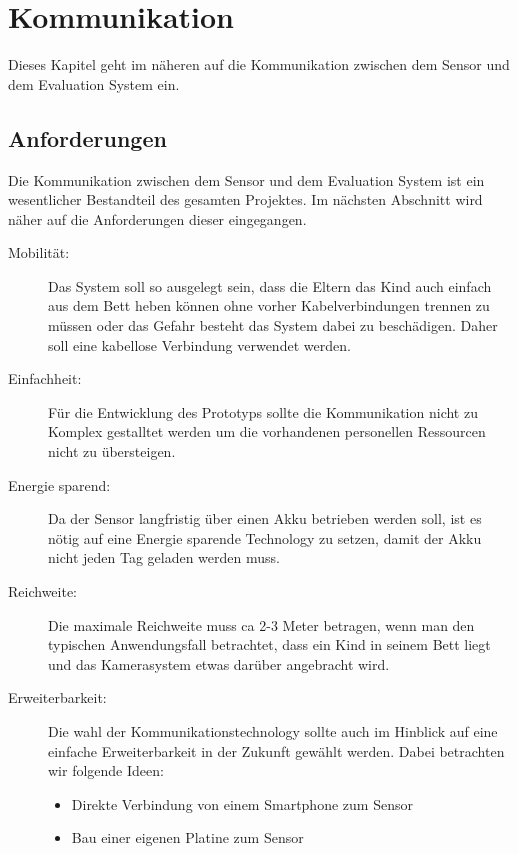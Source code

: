 \section{Kommunikation}
\label{sec:com}

Dieses Kapitel geht im näheren auf die Kommunikation zwischen dem Sensor und dem Evaluation System ein. 


\subsection{Anforderungen}

Die Kommunikation zwischen dem Sensor und dem Evaluation System ist ein wesentlicher Bestandteil des gesamten Projektes. Im nächsten Abschnitt wird näher auf die Anforderungen dieser eingegangen.

\begin{description}
  \item[Mobilität:]
  Das System soll so ausgelegt sein, dass die Eltern das Kind auch einfach aus dem Bett heben können ohne vorher Kabelverbindungen trennen zu müssen oder das Gefahr besteht das System dabei zu beschädigen. Daher soll eine kabellose Verbindung verwendet werden.
  
  \item[Einfachheit:]
  Für die Entwicklung des Prototyps sollte die Kommunikation nicht zu Komplex gestalltet werden um die vorhandenen personellen Ressourcen nicht zu übersteigen. 
  
  \item[Energie sparend:]
  Da der Sensor langfristig über einen Akku betrieben werden soll, ist es nötig auf eine Energie sparende Technology zu setzen, damit der Akku nicht jeden Tag geladen werden muss.
  
  \item[Reichweite:]
  Die maximale Reichweite muss ca 2-3 Meter betragen, wenn man den typischen Anwendungsfall betrachtet, dass ein Kind in seinem Bett liegt und das Kamerasystem etwas darüber angebracht wird.
  
  \item[Erweiterbarkeit:]
  Die wahl der Kommunikationstechnology sollte auch im Hinblick auf eine einfache Erweiterbarkeit in der Zukunft gewählt werden. Dabei betrachten wir folgende Ideen:
  \begin{itemize}
    \item Direkte Verbindung von einem Smartphone zum Sensor
    \item Bau einer eigenen Platine zum Sensor 
  \end{itemize}
   
\end{description}

